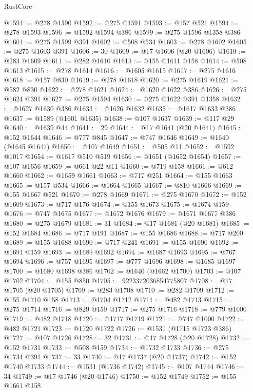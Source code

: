 \begin{lexlean}{RustCore}
\begin{coremodule}
@1591 := @278 @1590
@1592 := @275 @1591
@1593 := @157 @521
@1594 := @278 @1593
@1596 := @1592 @1594 @386
@1599 := @275 @1596 @1358 @386
@1601 := @275 @1599 @391
@1602 := @508 @534
@1603 := @278 @1602
@1605 := @275 @1603 @391
@1606 := 30
@1609 := @17 @1606 (@20 @1606)
@1610 := @283 @1609
@1611 := @282 @1610
@1613 := @155 @1611 @158
@1614 := @508 @1613
@1615 := @278 @1614
@1616 := @1605 @1615
@1617 := @275 @1616
@1618 := @157 @830
@1619 := @278 @1618
@1620 := @275 @1619
@1621 := @582 @830
@1622 := @278 @1621
@1624 := @1620 @1622 @386
@1626 := @275 @1624 @391
@1627 := @275 @1594
@1630 := @275 @1622 @391 @1358
@1632 := @1627 @1630 @386
@1633 := @1626 @1632
@1635 := @1617 @1633 @386
@1637 := @1589 (@1601 @1635)
@1638 := @107 @1637
@1639 := @117 @29
@1640 := @1639 @44
@1641 := 29
@1644 := @17 @1641 (@20 @1641)
@1645 := @152 @1644
@1646 := @777 @845
@1647 := @747 @1646
@1649 := @1640 (@1645 @1647)
@1650 := @107 @1649
@1651 := @505 @11
@1652 := @1592 @1017
@1654 := @1617 @510 @519
@1656 := @1651 (@1652 @1654)
@1657 := @107 @1656
@1659 := @661 @22 @11
@1660 := @719 @158
@1661 := @612 @1660
@1662 := @1659 @1661
@1663 := @717 @251
@1664 := @155 @1663
@1665 := @157 @534
@1666 := @1664 @1665
@1667 := @810 @1666
@1669 := @155 @1667 @521
@1670 := @278 @1669
@1671 := @275 @1670
@1672 := @152 @1609
@1673 := @717 @176
@1674 := @155 @1673
@1675 := @1674 @159
@1676 := @747 @1675
@1677 := @1672 @1676
@1679 := @1671 @1677 @386
@1680 := @275 @1679
@1681 := 31
@1684 := @17 @1681 (@20 @1681)
@1685 := @152 @1684
@1686 := @717 @191
@1687 := @155 @1686
@1688 := @717 @200
@1689 := @155 @1688
@1690 := @717 @241
@1691 := @155 @1690
@1692 := @1691 @159
@1693 := @1689 @1692
@1694 := @1687 @1693
@1695 := @767 @1694
@1696 := @757 @1695
@1697 := @777 @1696
@1698 := @1685 @1697
@1700 := @1680 @1698 @386
@1702 := @1640 (@1662 @1700)
@1703 := @107 @1702
@1704 := @155 @850
@1705 := 9223372036854775807
@1708 := @17 @1705 (@20 @1705)
@1709 := @283 @1708
@1710 := @282 @1709
@1712 := @155 @1710 @158
@1713 := @1704 @1712
@1714 := @482 @1713
@1715 := @275 @1714
@1716 := @829 @159
@1717 := @275 @1716
@1718 := @779 @1000
@1719 := @482 @1718
@1720 := @1717 @1719
@1721 := @747 @1000
@1722 := @482 @1721
@1723 := @1720 @1722
@1726 := @1531 (@1715 @1723 @386)
@1727 := @107 @1726
@1728 := 32
@1731 := @17 @1728 (@20 @1728)
@1732 := @152 @1731
@1733 := @508 @159
@1734 := @1732 @1733
@1736 := @275 @1734 @391
@1737 := 33
@1740 := @17 @1737 (@20 @1737)
@1742 := @152 @1740 @1733
@1744 := @1531 (@1736 @1742)
@1745 := @107 @1744
@1746 := 34
@1749 := @17 @1746 (@20 @1746)
@1750 := @152 @1749
@1752 := @155 @1661 @158

\end{coremodule}
\end{lexlean}

